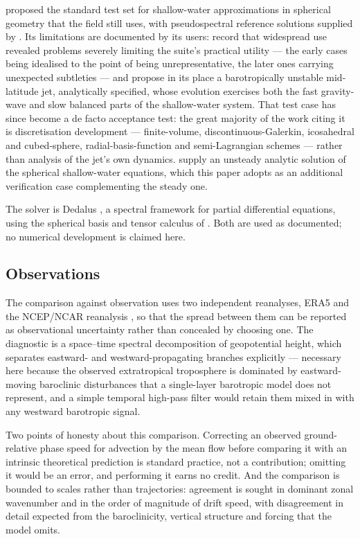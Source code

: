 \citet{williamson1992} proposed the standard test set for shallow-water
approximations in spherical geometry that the field still uses, with pseudospectral
reference solutions supplied by \citet{jakobchien1995}. Its limitations are
documented by its users: \citet{galewsky2004} record that widespread use revealed
problems severely limiting the suite's practical utility --- the early cases being
idealised to the point of being unrepresentative, the later ones carrying
unexpected subtleties --- and propose in its place a barotropically unstable
mid-latitude jet, analytically specified, whose evolution exercises both the fast
gravity-wave and slow balanced parts of the shallow-water system. That test case
has since become a de facto acceptance test: the great majority of the work citing
it is discretisation development --- finite-volume, discontinuous-Galerkin,
icosahedral and cubed-sphere, radial-basis-function and semi-Lagrangian schemes ---
rather than analysis of the jet's own dynamics. \citet{lauter2005} supply an
unsteady analytic solution of the spherical shallow-water equations, which this
paper adopts as an additional verification case complementing the steady one.

The solver is Dedalus \citep{burns2020}, a spectral framework for partial
differential equations, using the spherical basis and tensor calculus of
\citet{vasil2019}. Both are used as documented; no numerical development is claimed
here.

\subsection{Observations}

The comparison against observation uses two independent reanalyses, ERA5
\citep{hersbach2020} and the NCEP/NCAR reanalysis \citep{kalnay1996}, so that the
spread between them can be reported as observational uncertainty rather than
concealed by choosing one. The diagnostic is a space--time spectral decomposition
of geopotential height, which separates eastward- and westward-propagating branches
explicitly --- necessary here because the observed extratropical troposphere is
dominated by eastward-moving baroclinic disturbances that a single-layer barotropic
model does not represent, and a simple temporal high-pass filter would retain them
mixed in with any westward barotropic signal.

Two points of honesty about this comparison. Correcting an observed
ground-relative phase speed for advection by the mean flow before comparing it with
an intrinsic theoretical prediction is standard practice, not a contribution;
omitting it would be an error, and performing it earns no credit. And the
comparison is bounded to scales rather than trajectories: agreement is sought in
dominant zonal wavenumber and in the order of magnitude of drift speed, with
disagreement in detail expected from the baroclinicity, vertical structure and
forcing that the model omits.
